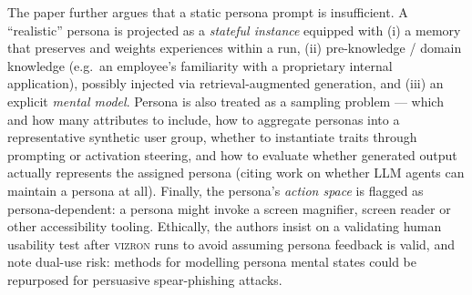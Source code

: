 The paper further argues that a static persona prompt is insufficient. A ``realistic''
persona is projected as a \emph{stateful instance} equipped with (i) a memory that preserves
and weights experiences within a run, (ii) pre-knowledge / domain knowledge (e.g.\ an
employee's familiarity with a proprietary internal application), possibly injected via
retrieval-augmented generation, and (iii) an explicit \emph{mental model}. Persona is also
treated as a sampling problem --- which and how many attributes to include, how to aggregate
personas into a representative synthetic user group, whether to instantiate traits through
prompting or activation steering, and how to evaluate whether generated output actually
represents the assigned persona (citing work on whether LLM agents can maintain a persona at
all). Finally, the persona's \emph{action space} is flagged as persona-dependent: a persona
might invoke a screen magnifier, screen reader or other accessibility tooling. Ethically, the
authors insist on a validating human usability test after \textsc{vizron} runs to avoid
assuming persona feedback is valid, and note dual-use risk: methods for modelling persona
mental states could be repurposed for persuasive spear-phishing attacks.


